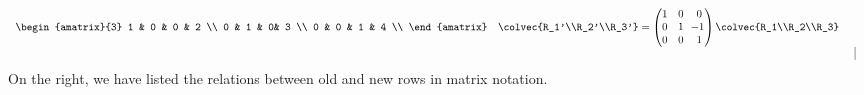 \begin{example}
\begin{equation*}
\begin{array}{ccc|r}
\begin{amatrix}{3} 
1 & 0 & 0 & 2 \\
0 & 1 & 0& 3 \\
0 & 0 & 1 & 4 \\ 
\end{amatrix}
&\colvec{R_1'\\R_2'\\R_3'}=\begin{pmatrix}1&0&0\\0&1&\!\!-1\\0&0&1\end{pmatrix}\colvec{R_1\\R_2\\R_3}\\[3mm]\phantom{x} &&&
\end{array}
\end{equation*}
On the right, we have listed the relations between  old and new rows in matrix notation.
\end{example}


%


